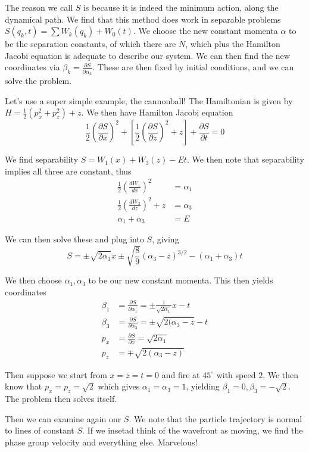 \documentclass[10pt]{report}
\newcommand{\rd}[2]{\frac{d#1}{d#2}}
\newcommand{\pd}[2]{\frac{\partial #1}{\partial#2}}
\begin{document}
The reason we call $S$ is because it is indeed the minimum action, along the dynamical path. We find that this method does work in separable problems $S(q_k,t) = \sum W_k(q_k) +W_0(t)$. We choose the new constant momenta $\alpha$ to be the separation constants, of which there are $N$, which plus the Hamilton Jacobi equation is adequate to describe our system. We can then find the new coordinates via $\beta_k = \pd{S}{\alpha_k}$. These are then fixed by initial conditions, and we can solve the problem.

Let's use a super simple example, the cannonball! The Hamiltonian is given by $H = \frac{1}{2}(p_x^2 + p_z^2) + z$. We then have Hamilton Jacobi equation
$$\frac{1}{2}\left( \pd{S}{x} \right)^2 + \left[ \frac{1}{2}\left( \pd{S}{z} \right)^2 + z \right] + \pd{S}{t} = 0$$

We find separability $S = W_1(x) + W_3(z) - Et$. We then note that separability implies all three are constant, thus
\begin{align*}
    \frac{1}{2}\left( \rd{W_1}{x} \right)^2 &= \alpha_1\\
    \frac{1}{2}\left( \rd{W_3}{z} \right)^2 + z &= \alpha_3\\
    \alpha_1 + \alpha_3 &= E
\end{align*}

We can then solve these and plug into $S$, giving
$$S = \pm \sqrt{2\alpha_1}x \pm\sqrt{\frac{8}{9}}(\alpha_3 - z)^{3/2} - (\alpha_1 + \alpha_3)t$$

We then choose $\alpha_1, \alpha_3$ to be our new constant momenta. This then yields coordinates
\begin{align*}
    \beta_1 &= \pd{S}{\alpha_1} = \pm \frac{1}{\sqrt{2\alpha_1}}x - t\\
    \beta_3 &= \pd{S}{\alpha_3} = \pm \sqrt{2(\alpha_3 - z} - t\\
    p_x &= \pd{S}{x} = \sqrt{2\alpha_1}\\
    p_z &= \mp \sqrt{2(\alpha_3 - z)}
\end{align*}

Then suppose we start from $x=z=t=0$ and fire at $45^\circ$ with speed $2$. We then know that $p_x = p_z = \sqrt{2}$ which gives $\alpha_1 = \alpha_3 = 1$, yielding $\beta_1 = 0, \beta_3 = -\sqrt{2}$. The problem then solves itself.

Then we can examine again our $S$. We note that the particle trajectory is normal to lines of constant $S$. If we insetad think of the wavefront as moving, we find the phase group velocity and everything else. Marvelous!
\end{document}
